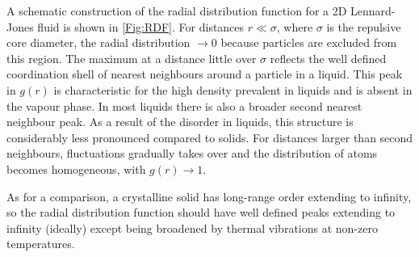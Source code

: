 \documentclass{article}
\theoremstyle{plain}\theoremheaderfont{\normalfont\itshape}\theorembodyfont{\rmfamily}\theoremseparator{.}\newtheorem*{rem}{Remark}\newtheorem*{ex}{Example}\newtheorem*{proof}{Proof}\newtheorem*{altp}{Alternative proof}
\theoremstyle{plain}\theoremheaderfont{\normalfont\bfseries}\theorembodyfont{\rmfamily}\theoremseparator{.}\newtheorem{thm}{Theorem}[section]\newtheorem{lem}[thm]{Lemma}\newtheorem{prop}[thm]{Proposition}\newtheorem*{cor}{Corollary}\newtheorem{defn}[thm]{Definition}\newtheorem{clm}[thm]{Claim}\newtheorem{clminproof}{Claim}\newtheorem{alg}[thm]{Algorithm}\newtheorem{hyp}[thm]{Hypothesis}\newtheorem{law}[thm]{Law}
\theoremstyle{break}\theoremheaderfont{\normalfont\itshape}\theorembodyfont{\rmfamily}\theoremseparator{.\medskip}\newtheorem*{proofskip}{Proof}\newtheorem*{exs}{Examples}\newtheorem*{rems}{Remarks}
\theoremstyle{break}\theoremheaderfont{\normalfont\bfseries}\theorembodyfont{\rmfamily}\theoremseparator{.\medskip}\newtheorem{lemskip}[thm]{Lemma}\newtheorem{defnskip}[thm]{Definition}\newtheorem{propskip}[thm]{Proposition}\newtheorem{thmskip}[thm]{Theorem}
\numberwithin{equation}{section}
\begin{document}
    A schematic construction of the radial distribution function for a 2D Lennard-Jones fluid is shown in \cref{Fig:RDF}. For distances \(r\ll \sigma\), where \(\sigma\) is the repulsive core diameter, the radial distribution \(\to 0\) because particles are excluded from this region. The maximum at a distance little over \(\sigma\) reflects the well defined coordination shell of nearest neighbours around a particle in a liquid. This peak in \(g(r)\) is characteristic for the high density prevalent in liquids and is absent in the vapour phase. In most liquids there is also a broader second nearest neighbour peak. As a result of the disorder in liquids, this structure is considerably less pronounced compared to solids. For distances larger than second neighbours, fluctuations gradually takes over and the distribution of atoms becomes homogeneous, with \(g(r)\to 1\).

    As for a comparison, a crystalline solid has long-range order extending to infinity, so the radial distribution function should have well defined peaks extending to infinity (ideally) except being broadened by thermal vibrations at non-zero temperatures.
\end{document}
